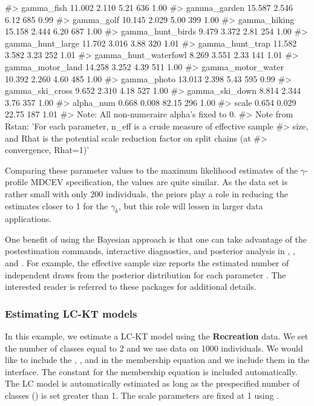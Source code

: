 \begin{example}
#> gamma_fish             11.002   2.110   5.21   636 1.00
#> gamma_garden           15.587   2.546   6.12   685 0.99
#> gamma_golf             10.145   2.029   5.00   399 1.00
#> gamma_hiking           15.158   2.444   6.20   687 1.00
#> gamma_hunt_birds        9.479   3.372   2.81   254 1.00
#> gamma_hunt_large       11.702   3.016   3.88   320 1.01
#> gamma_hunt_trap        11.582   3.582   3.23   252 1.01
#> gamma_hunt_waterfowl    8.269   3.551   2.33   141 1.01
#> gamma_motor_land       14.258   3.252   4.39   511 1.00
#> gamma_motor_water      10.392   2.260   4.60   485 1.00
#> gamma_photo            13.013   2.398   5.43   595 0.99
#> gamma_ski_cross         9.652   2.310   4.18   527 1.00
#> gamma_ski_down          8.814   2.344   3.76   357 1.00
#> alpha_num               0.668   0.008  82.15   296 1.00
#> scale                   0.654   0.029  22.75   187 1.01
#> Note: All non-numeraire alpha's fixed to 0. 
#> Note from Rstan: 'For each parameter, n_eff is a crude measure of effective sample 
#> size, and Rhat is the potential scale reduction factor on split chains (at 
#> convergence, Rhat=1)'
\end{example}

Comparing these parameter values to the maximum likelihood estimates of
the \(\gamma\)-profile MDCEV specification, the values are quite
similar. As the data set is rather small with only 200 individuals, the
priors play a role in reducing the estimates closer to 1 for the
\(\gamma_k\), but this role will lessen in larger data applications.

One benefit of using the Bayesian approach is that one can take
advantage of the postestimation commands, interactive diagnostics, and
posterior analysis in ,
\href{https://mc-stan.org/bayesplot/}{}
\citep{gabrybayesplot2019}, and
\href{http://mc-stan.org/shinystan/}{}
\citep{muthuser2018}. For example, the effective sample size reports the
estimated number of independent draws from the posterior distribution
for each parameter \citep{stan2019}. The interested reader is referred
to these packages for additional details.

\hypertarget{estimating-lc-kt-models}{%
\subsubsection{Estimating LC-KT models}\label{estimating-lc-kt-models}}

In this example, we estimate a LC-KT model using the \textbf{Recreation}
data. We set the number of classes equal to 2 and we use data on 1000
individuals. We would like to include the ,
, and  in the membership equation and we
include them in the  interface. The constant for the
membership equation is included automatically. The LC model is
automatically estimated as long as the prespecified number of classes
() is set greater than 1. The scale parameters are
fixed at 1 using .

